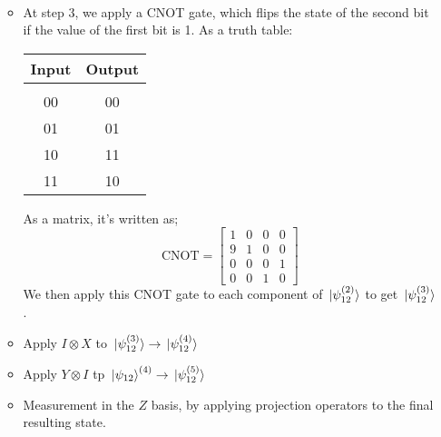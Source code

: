 \begin{itemize}
\begin{itemize}
\begin{multline*}
				\end{multline*} 
			\item At step 3, we apply a CNOT gate, which flips the state of the second bit if the value of the first 
				bit is 1. As a truth table:
				\begin{center}
					\begin{tabular}{c|c}
						Input & Output\\
						\hline\\
						00 & 00\\
						01 & 01\\
						10 & 11\\ 
						11 & 10
					\end{tabular}
				\end{center}
				As a matrix, it's written as;
				\[
					\text{CNOT} = 
					\begin{bmatrix} 1 & 0 & 0 & 0\\ 9 & 1 & 0 & 0\\ 0 & 0 & 0 & 1\\ 0 & 0 & 1 & 0 \end{bmatrix} 
				\] 
				We then apply this CNOT gate to each component of \( \ket*{\psi_{12}^{(2)}} \) to get 
				\( \ket*{\psi_{12}^{(3)}} \). 
			\item Apply \( I \otimes X \) to \( \ket*{\psi_{12}^{(3)}} \to \ket*{\psi_{12}^{(4)}}\) 
			\item Apply \( Y \otimes I \) tp \( \ket*{\psi_{12}}^{(4)}  \to \ket*{\psi_{12}^{(5)}}\)
			\item Measurement in the \( Z \) basis, by applying projection operators to the final resulting state.  
		\end{itemize}
\end{itemize}
